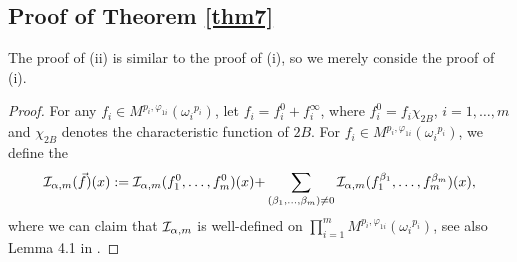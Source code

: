 \documentclass[11pt, twoside, leqno]{article}
\begin{document}
\subsection{Proof of Theorem \ref{thm7}}
The proof of (ii) is similar to the proof of (i), so we merely conside the proof of (i).
\begin{proof}[Proof]
	For any ${f_i} \in {M^{{p_i},{\varphi _{1i}}}}\left( {{{\omega _i}^{{p_i}}}} \right)$, let $f_i=f^0_i+f^{\infty}_i$, where $f^0_i=f_i\chi_{2B}$, $i=1,\ldots,m$ and $\chi_{2B}$ denotes the characteristic function of $2B$. For ${f_i} \in {M^{{p_i},{\varphi _{1i}}}}\left( {{{\omega _i}^{{p_i}}}} \right)$, we define the  
	\begin{align*}
	{{\cal I}_{\alpha ,m}}(\vec f)(x): = {{\cal I}_{\alpha ,m}}(f_1^0, \ldots ,f_m^0)(x){\rm{ + }}\sum\limits_{({\beta _1}, \ldots ,{\beta _m}) \ne 0} {{{\cal I}_{\alpha ,m}}(f_1^{{\beta _1}}, \ldots ,f_m^{{\beta _m}})(x)},
	\end{align*}
	where we can claim that ${{\cal I}_{\alpha ,m}}$ is well-defined on $\prod\limits_{i = 1}^m {{M^{{p_i},{\varphi _{1i}}}}\left( {{\omega _i}^{{p_i}}} \right)}$, see also Lemma 4.1 in \cite{Gu2}.
	

\end{proof}
\end{document}
